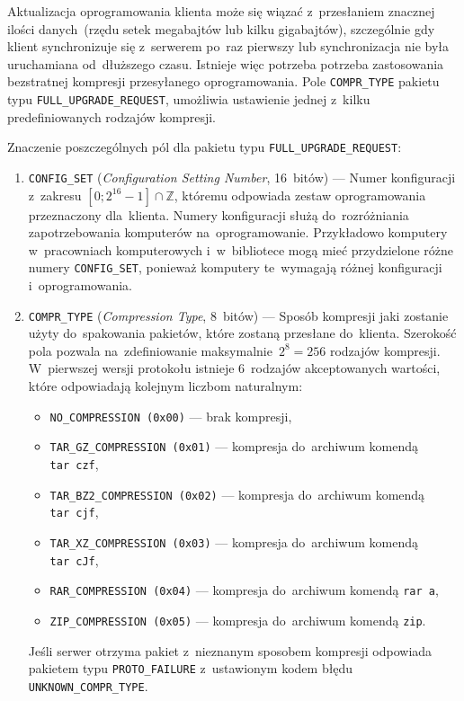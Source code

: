 \documentclass[thesis]{subfiles}
\begin{document}
Aktualizacja oprogramowania klienta może się wiązać z~przesłaniem znacznej ilości danych~(rzędu setek megabajtów lub kilku gigabajtów), szczególnie gdy klient synchronizuje się z~serwerem po~raz pierwszy lub synchronizacja nie była uruchamiana od~dłuższego czasu. Istnieje więc potrzeba potrzeba zastosowania bezstratnej kompresji przesyłanego oprogramowania. Pole \texttt{COMPR\_TYPE} pakietu typu \texttt{FULL\_UPGRADE\_REQUEST}, umożliwia ustawienie jednej z~kilku predefiniowanych rodzajów kompresji.

Znaczenie poszczególnych pól dla pakietu typu \texttt{FULL\_UPGRADE\_REQUEST}:\mynobreakpar
\begin{enumerate}
	\item \texttt{CONFIG\_SET} (\emph{Configuration Setting Number}, 16~bitów) --- Numer konfiguracji z~zakresu $[0;2^{16}-1]\cap\mathbb{Z}$, któremu odpowiada zestaw oprogramowania przeznaczony dla~klienta. Numery konfiguracji służą do~rozróżniania zapotrzebowania komputerów na~oprogramowanie. Przykładowo komputery w~pracowniach komputerowych i~w~bibliotece mogą mieć przydzielone różne numery \texttt{CONFIG\_SET}, ponieważ komputery te~wymagają różnej konfiguracji i~oprogramowania.
	\item \texttt{COMPR\_TYPE} (\emph{Compression Type}, 8~bitów) --- Sposób kompresji jaki zostanie użyty do~spakowania pakietów, które zostaną przesłane do~klienta. Szerokość pola pozwala na~zdefiniowanie maksymalnie~$2^8=256$ rodzajów kompresji. W~pierwszej wersji protokołu istnieje 6~rodzajów akceptowanych wartości, które odpowiadają kolejnym liczbom naturalnym:
		\begin{itemize}
			\item \texttt{NO\_COMPRESSION (0x00)} --- brak kompresji,
			\item \texttt{TAR\_GZ\_COMPRESSION (0x01)} --- kompresja do~archiwum  komendą \texttt{tar~czf},
			\item \texttt{TAR\_BZ2\_COMPRESSION (0x02)} --- kompresja do~archiwum  komendą \texttt{tar~cjf},
			\item \texttt{TAR\_XZ\_COMPRESSION (0x03)} --- kompresja do~archiwum  komendą \texttt{tar~cJf},
			\item \texttt{RAR\_COMPRESSION (0x04)} --- kompresja do~archiwum  komendą \texttt{rar~a},
			\item \texttt{ZIP\_COMPRESSION (0x05)} --- kompresja do~archiwum  komendą \texttt{zip}.
		\end{itemize}
	Jeśli serwer otrzyma pakiet z~nieznanym sposobem kompresji odpowiada pakietem typu \texttt{PROTO\_FAILURE} z~ustawionym kodem błędu \texttt{UNKNOWN\_COMPR\_TYPE}.

\end{enumerate}
\end{document}
